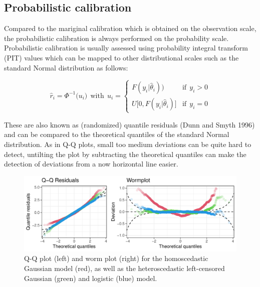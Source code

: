 \documentclass[twoside]{report}
\begin{document}
\subsection{Probabilistic calibration}

Compared to the mariginal calibration which is obtained on the observation scale,
the probabilistic calibration is always performed on the probability scale.
Probabilistic calibration is usually assessed using probability integral
transform (PIT) values which can be mapped to other distributional scales
such as the standard Normal distribution as follows:

$$
\hat{r}_i = \Phi^{-1}\big(u_i)~~\text{with}~~u_i = \begin{cases}
     F(y_i | \hat{\theta}_i)\big) & \text{if}~~y_i > 0 \\
     U\big[0, F(y_i | \hat{\theta}_i)\big] & \text{if}~~y_i = 0
\end{cases}
$$

These are also known as (randomized) quantile residuals (Dunn and Smyth 1996)
and can be compared to the theoretical quantiles of the standard Normal
distribution. 
As in Q-Q plots, small too medium deviations can be quite hard to detect,
untilting the plot by subtracting the theoretical quantiles can make 
the detection of deviations from a now horizontal line easier.

\begin{figure}[!ht]\centering
    \includegraphics[width=\textwidth]{Stauffer-qqresiduals}
    \caption{\label{stauffer:fig2} 
        Q-Q plot (left) and worm plot (right) for the homoscedastic
        Gaussian model (red), as well as the heteroscedastic left-censored
        Gaussian (green) and logistic (blue) model.
    }
\end{figure}

\end{document}
